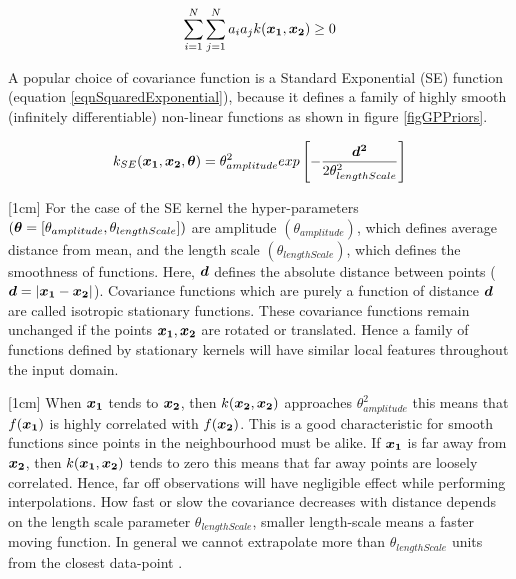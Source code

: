 \begin{equation}\label{equationPDKernel}
\sum_{i=1}^{N}\sum_{j=1}^{N}a_{i}a_{j}k(\boldsymbol{x_1},\boldsymbol{x_2}) \geq 0
\end{equation}

A popular choice of covariance function is a Standard Exponential (SE) function (equation \ref{eqnSquaredExponential}), because it defines a family of highly smooth (infinitely differentiable) non-linear functions as shown in figure \ref{figGPPriors}.

\begin{equation}\label{eqnSquaredExponential}
k_{SE}(\boldsymbol{x_1}, \boldsymbol{x_2}, \boldsymbol{\theta}) = \theta_{amplitude}^2exp \left [-\frac{\boldsymbol{d^2}}{2\theta_{lengthScale}^2} \right ]
\end{equation}

[1cm]
For the case of the SE kernel the hyper-parameters $(\boldsymbol{\theta} = [\theta_{amplitude}, \theta_{lengthScale}])$ are amplitude $(\theta_{amplitude})$, which defines average distance from mean, and the length scale $(\theta_{lengthScale})$, which defines the smoothness of functions. Here, $\boldsymbol{d}$ defines the absolute distance between points ($\boldsymbol{d} = |\boldsymbol{x_1}-\boldsymbol{x_2}|$). Covariance functions which are purely a function of distance $\boldsymbol{d}$ are called isotropic stationary functions. These covariance functions remain unchanged if the points $\boldsymbol{x_{1}}, \boldsymbol{x_{2}}$ are rotated or translated. Hence a family of functions defined by stationary kernels will have similar local features throughout the input domain. 

[1cm]
When $\boldsymbol{x_1}$ tends to $\boldsymbol{x_2}$, then $k(\boldsymbol{x_2}, \boldsymbol{x_2})$ approaches $\theta_{amplitude}^{2}$ this means that $f(\boldsymbol{x_1})$ is highly correlated with $f(\boldsymbol{x_2})$. This is a good characteristic for smooth functions since points in the neighbourhood must be alike. If $\boldsymbol{x_1}$ is far away from  $\boldsymbol{x_2}$, then $k(\boldsymbol{x_1}, \boldsymbol{x_2})$ tends to zero this means that far away points are loosely correlated. Hence, far off observations will have negligible effect while performing interpolations. How fast or slow the covariance decreases with distance depends on the length scale parameter $\theta_{lengthScale}$, smaller length-scale means a faster moving function. In general we cannot extrapolate more than $\theta_{lengthScale}$ units from the closest data-point \cite{duvenaud-thesis-2014}. 

